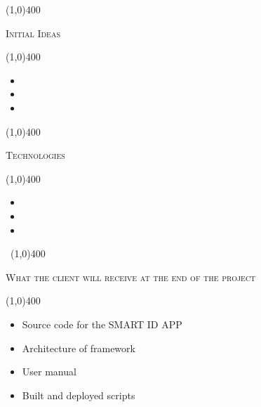 \documentclass[12pt,a4paper]{report}
\begin{document}
\begin{center}
	
	\line(1,0){400}\\
	{\scshape\large Initial Ideas \par}
	\line(1,0){400}\\
	\end{center}
		\begin{itemize}
\item 
\item 
\item
\end{itemize}
\begin{center}
	
	\line(1,0){400}\\
	{\scshape\large Technologies \par}
	\line(1,0){400}\\
	\end{center}
		\begin{itemize}
\item 
\item 
\item
\end{itemize}
\newpage

\begin{center}
	
	\vspace*{-3cm}\
	\line(1,0){400}\\
	{\scshape\large What the client will receive at the end of the project\par}
	\line(1,0){400}\\
	\end{center}
		\begin{itemize}
\item Source code for the SMART ID APP
\item Architecture of framework
\item User manual
\item Built and deployed scripts

\end{itemize}
\end{document}
